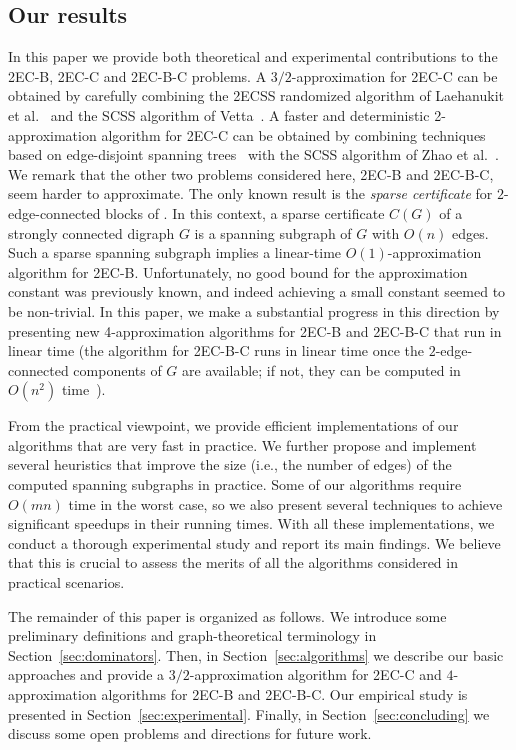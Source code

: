 \documentclass[11pt]{article}
\begin{document}
\subsection{Our results}
\label{sec:our-results}
In this paper we provide both theoretical and experimental contributions to the \textsf{2EC-B}, \textsf{2EC-C} and \textsf{2EC-B-C} problems.
A $3/2$-approximation for \textsf{2EC-C} can be obtained by carefully combining the \textsf{2ECSS} randomized algorithm of Laehanukit et al.~\cite{LGS:MSCS:2012} and the \textsf{SCSS} algorithm of Vetta~\cite{Vetta:MSCS:2001}. A faster and deterministic 2-approximation algorithm for \textsf{2EC-C} can be obtained by combining techniques based on edge-disjoint spanning trees~\cite{edge-disjoint:edmonds,st:t} with the \textsf{SCSS} algorithm of  Zhao et al.~\cite{ZNI:MSCS:2003}.
We remark that the other two problems considered here, \textsf{2EC-B} and \textsf{2EC-B-C}, seem harder to approximate.
The only known result is the \emph{sparse certificate} for $2$-edge-connected blocks of \cite{2ECB}.
In this context, a sparse certificate $C(G)$ of a strongly connected digraph $G$ is a spanning subgraph of $G$ with $O(n)$ edges.
Such a sparse spanning subgraph implies a linear-time $O(1)$-approximation algorithm for \textsf{2EC-B}.
Unfortunately, no good bound for the approximation constant was previously known, and indeed achieving a small constant seemed to be non-trivial.
In this paper, we make a substantial progress in this direction
by presenting new 4-approximation algorithms for \textsf{2EC-B} and \textsf{2EC-B-C} that run in linear time (the algorithm for \textsf{2EC-B-C} runs in linear time once the $2$-edge-connected components of $G$ are available; if not, they can be computed in $O(n^2)$ time~\cite{2CC:HenzingerKL14}).

From the practical viewpoint, we provide efficient implementations of our algorithms that are very fast in practice.
We further propose and implement several heuristics that improve the size (i.e., the number of edges) of the computed spanning subgraphs in practice.
Some of our algorithms require $O(mn)$ time in the worst case, so we also present several techniques to achieve significant speedups in their running times.
With all these implementations, we conduct a thorough experimental study and report its main findings. We believe that this is crucial to assess the merits of all the algorithms considered in practical scenarios.

The remainder of this paper is organized as follows.
We introduce some preliminary definitions and graph-theoretical terminology in Section~\ref{sec:dominators}.
Then, in Section~\ref{sec:algorithms} we describe our basic approaches and provide a $3/2$-approximation algorithm for \textsf{2EC-C} and $4$-approximation algorithms for \textsf{2EC-B} and \textsf{2EC-B-C}.
Our empirical study is presented in Section~\ref{sec:experimental}.
Finally, in Section~\ref{sec:concluding} we discuss some open problems and directions for future work.
\end{document}
